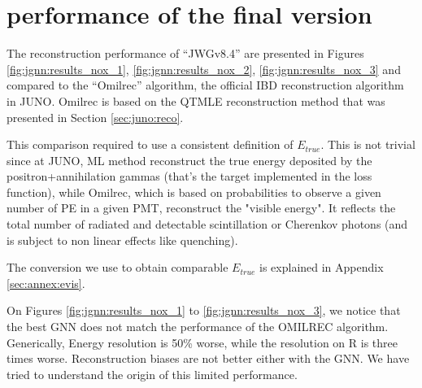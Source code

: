 \documentclass[../main.tex]{subfiles}
\begin{document}
\section{performance of the final version}
\label{sec:jgnn:results}


The reconstruction performance of ``JWGv8.4'' are presented in Figures \ref{fig:jgnn:results_nox_1}, \ref{fig:jgnn:results_nox_2}, \ref{fig:jgnn:results_nox_3} and compared to the ``Omilrec'' algorithm, the official IBD reconstruction algorithm in JUNO. Omilrec is based on the QTMLE reconstruction method that was presented in Section \ref{sec:juno:reco}.

This comparison required to use a consistent definition of $E_{true}$. This is not trivial since at JUNO, ML method reconstruct the true energy deposited by the positron+annihilation gammas (that's the target implemented in the loss function), while Omilrec, which is based on probabilities to observe a given number of PE in a given PMT, reconstruct the "visible energy". It reflects the total number of radiated and detectable scintillation or Cherenkov photons (and is subject to non linear effects like quenching).

The conversion we use to obtain comparable $E_{true}$ is explained in Appendix \ref{sec:annex:evis}.

On Figures \ref{fig:jgnn:results_nox_1} to \ref{fig:jgnn:results_nox_3}, we notice that the best GNN does not match the performance of the OMILREC algorithm. Generically, Energy resolution is 50\% worse, while the resolution on R is three times worse. Reconstruction biases are not better either with the GNN. We have tried to understand the origin of this limited performance.


%
\end{document}
